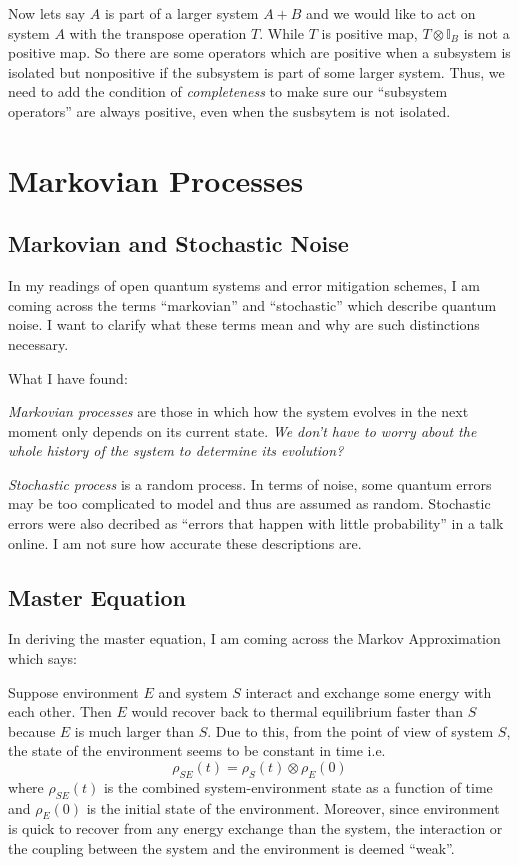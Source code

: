 \documentclass{article}
\begin{document}
 Now lets say \(A\) is part of a larger system \(A+B\) and we would like to
 act on system \(A\) with the transpose operation \(T\). While \(T\) is
 positive map, \(T \otimes \mathbb{I}_B\) is not a positive map. So there are
 some operators which are positive when a subsystem is isolated but nonpositive
 if the subsystem is part of some larger system. Thus, we need to add the condition
 of \textit{completeness} to make sure our ``subsystem operators'' are always
 positive, even when the susbsytem is not isolated.

 \section{Markovian Processes}
 \subsection{Markovian and Stochastic Noise}
 In my readings of open quantum systems and error mitigation schemes, I am coming across the terms ``markovian'' and ``stochastic'' which
 describe quantum noise. I want to clarify what these terms mean and
 why are such distinctions necessary.

 \noindent What I have found:

 \noindent \textit{Markovian processes} are those in which how the system evolves in the
 next moment only depends on its current state. \textit{We don't have to worry about the whole history of the system to determine its evolution?}

 \noindent \textit{Stochastic process} is a random process. In terms of noise, some quantum errors may be too complicated to model and thus are assumed as random. Stochastic errors were also decribed as ``errors
 that happen with little probability'' in a talk online. I am not sure how accurate these descriptions are.


 \subsection{Master Equation}
 In deriving the master equation, I am coming across the Markov Approximation which says:

Suppose environment $E$ and system $S$ interact and exchange some energy with each other. Then $E$ would recover back to thermal equilibrium faster than $S$ because $E$ is much larger than $S$. Due to this, from the point of view of system $S$, the state of the environment seems to be constant in time i.e.
$$\rho_{SE}(t) = \rho_{S}(t) \otimes\rho_E(0)$$
where $\rho_{SE}(t)$ is the combined system-environment state as a function of time and $\rho_E(0)$ is the initial state of the environment. Moreover, since environment is quick to recover from any energy exchange than the system, the interaction or the coupling between the system and the environment is deemed ``weak''.
\end{document}

